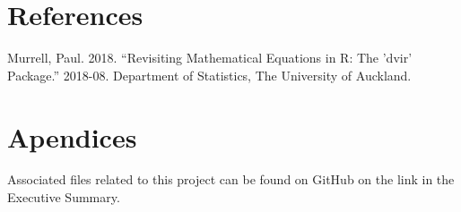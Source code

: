 \documentclass[]{article}
\begin{document}
\newpage

\section{References}\label{references}

\hypertarget{refs}{}
\hypertarget{ref-murrell-dvir}{}
Murrell, Paul. 2018. ``Revisiting Mathematical Equations in R: The
'dvir' Package.'' 2018-08. Department of Statistics, The University of
Auckland.

\newpage{}

\section{Apendices}\label{apendices}

Associated files related to this project can be found on GitHub on the
link in the Executive Summary.
\end{document}
